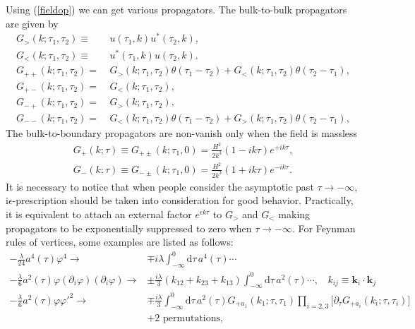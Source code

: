 \documentclass[a4paper,11pt]{article}
\newcommand{\nn}{\nonumber}
\newcommand{\nd}{\mathrm{d}}
\def\eqref#1{(\ref{#1})}
\begin{document}
Using \eqref{fieldop} we can get various propagators. The bulk-to-bulk propagators are given by
\begin{align}
G_>(k;\tau_1,\tau_2)\equiv&~u(\tau_1,k)u^*(\tau_2,k),\nn\\
G_<(k;\tau_1,\tau_2)\equiv&~u^{*}(\tau_1,k)u(\tau_2,k).\\
G_{++}(k;\tau_1,\tau_2)=&~G_>(k;\tau_1,\tau_2)\theta(\tau_1-\tau_2)+G_<(k;\tau_1,\tau_2)\theta(\tau_2-\tau_1),\nn\\
G_{+-}(k;\tau_1,\tau_2)=&~G_<(k;\tau_1,\tau_2),\nn\\
G_{-+}(k;\tau_1,\tau_2)=&~G_>(k;\tau_1,\tau_2),\nn\\
G_{--}(k;\tau_1,\tau_2)=&~G_<(k;\tau_1,\tau_2)\theta(\tau_1-\tau_2)+G_>(k;\tau_1,\tau_2)\theta(\tau_2-\tau_1),  \label{eq:proptype}
\end{align}
The bulk-to-boundary propagators are non-vanish only when the field is massless 
\begin{align}
G_{+}(k;\tau)\equiv G_{+\pm}(k;\tau_1,0)=\frac{H^2}{2k^3}(1-ik\tau)e^{+ik\tau} ,\nn\\
G_{-}(k;\tau)\equiv G_{-\pm}(k;\tau_1,0)=\frac{H^2}{2k^3}(1+ik\tau)e^{-ik\tau} .
\end{align}
It is necessary to notice that when people consider the asymptotic past $\tau\to-\infty$, i$\epsilon$-prescription \cite{Chen:2017ryl} should be taken into consideration for good behavior. Practically, it is equivalent to attach an external factor $e^{\epsilon k \tau}$ to $G_>$ and $G_<$  making propagators to be exponentially suppressed to zero when $\tau\to-\infty$.
For Feynman rules of  vertices, some examples are listed as  follows:
\begin{align}
-\frac{\lambda}{24}a^4(\tau)\varphi^4  \to & \mp i\lambda \int_{-\infty}^{0}\nd\tau\,a^4(\tau)\cdots \nn\\
-\frac{\lambda}{6}a^2(\tau)\varphi(\partial_i\varphi)(\partial_i\varphi)\to &
\pm \frac{i\lambda}{3} (k_{12}+k_{23}+k_{13})\int_{-\infty}^{0}\nd\tau\,a^2(\tau)\cdots,~~~~k_{ij}\equiv \bm{k}_i\cdot \bm{k}_j \nn\\
-\frac{\lambda}{6}a^2(\tau)\varphi\varphi'^2 \to & \mp \frac{i \lambda}{3}\int_{-\infty}^{0}\nd\tau\,a^2(\tau)G_{+a_1}(k_1;\tau,\tau_1)\prod_{i=2,3}\big[\partial_{\tau}G_{+a_i}(k_i;\tau,\tau_i)\big]\nn\\
      &+\text{2 permutations},
\end{align}
\end{document}

